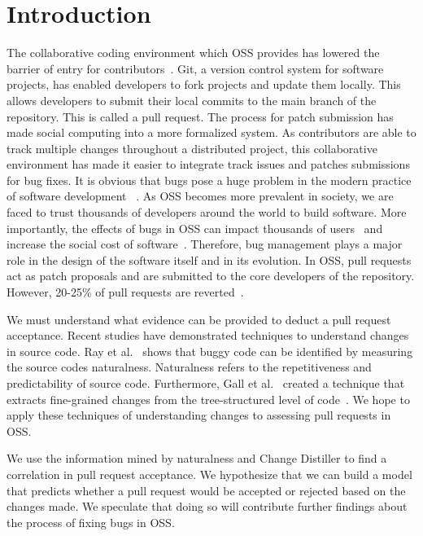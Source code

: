 \documentclass[10pt, conference]{IEEEtran}
\begin{document}
\section{Introduction}
\label{introduction}
The collaborative coding environment which OSS provides has lowered the barrier of entry for contributors~\cite{Yu}. Git, a version control system for software projects, has enabled developers to fork projects and update them locally. This allows developers to submit their local commits to the main branch of the repository. This is called a pull request. The process for patch submission has made social computing into a more formalized system. As contributors are able to track multiple changes throughout a distributed project, this collaborative environment has made it easier to integrate track issues and patches submissions for bug fixes.
\newline
\newline \indent It is obvious that bugs pose a huge problem in the modern practice of software development ~\cite{Asundi:2005:NEE:1082983.1083260}. As OSS becomes more prevalent in society, we are faced to trust thousands of developers around the world to build software. More importantly, the effects of bugs in OSS can impact thousands of users~\cite{Giachino:2014:CRD:2731750.2731754} and increase the social cost of software~\cite{Tassey.2002}. Therefore, bug management plays a major role in the design of the software itself and in its evolution. In OSS, pull requests act as patch proposals and are submitted to the core developers of the repository. However, 20-25\% of pull requests are reverted~\cite{Tsay:2014:LTE:2635868.2635882}.

We must understand what evidence can be provided to deduct a pull request acceptance. Recent studies have demonstrated techniques to understand changes in source code. Ray et al.~\cite{Ray:2016:NBC:2884781.2884848} shows that buggy code can be identified by measuring the source code\textquotesingle s naturalness. Naturalness refers to the repetitiveness and predictability of source code. Furthermore, Gall et al.~\cite{Gall:2009:CAE:1495795.1495953} created a technique that extracts fine-grained changes from the tree-structured level of code~\cite{1631103}. We hope to apply these techniques of understanding changes to assessing pull requests in OSS.

We use the information mined by naturalness and Change Distiller to find a correlation in pull request acceptance. We hypothesize that we can build a model that predicts whether a pull request would be accepted or rejected based on the changes made. We speculate that doing so will contribute further findings about the process of fixing bugs in OSS.
\end{document}
